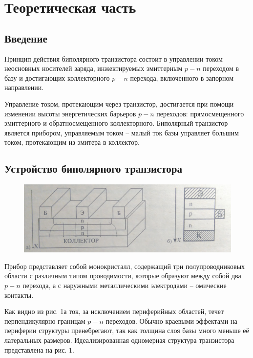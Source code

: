 

\def\labauthors{Понур К.А.}
\def\labgroup{440}
\def\labnumber{1}
\def\labtheme{Измерение статических характеристик биполярного транзистора}
\def\department{Кафедра электроники и квантовой радиофизики}

\newpage
\section{Теоретическая часть}%
\subsection{Введение}%


Принцип действия биполярного транзистора состоит в управлении током неосновных носителей заряда, инжектируемых эмиттерным $p-n$ переходом
в базу и достигающих коллекторного $p-n$ перехода, включенного в запорном направлении. 

Управление током, протекающим через транзистор, достигается при помощи изменении высоты энергетических барьеров $p-n$ переходов:
прямосмещенного эмиттерного и обратносмещенного коллекторного. Биполярный транзистор является прибором, управляемым током -- малый ток
базы управляет большим током, протекающим из эмитера в коллектор.

\subsection{Устройство биполярного транзистора}%
\begin{figure}[h]
    \centering
    \includegraphics[width=\linewidth]{fig/1.jpg}
    \caption{}
    \label{fig:}
\end{figure}
Прибор представляет собой монокристалл, содержащий три полупроводниковых области с различным типом проводимости, которые
образуют между собой два $p-n$ перехода, а с наружными металлическими электродами -- омические контакты.

Как видно из рис. 1а ток, за исключением периферийных областей, течет перпендикулярно границам $p-n$ переходов. Обычно краевыми эффектами
на периферии структуры пренебрегают, так как толщина слоя базы много меньше её латеральных размеров. Идеализированная одномерная структура транзистора представлена на рис. 1.

